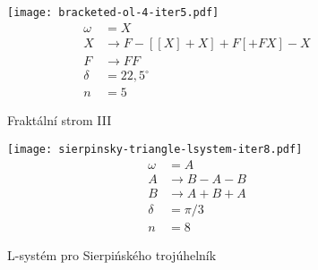 \begin{figure}[p]
    \centering
    \texttt{[image: bracketed-ol-4-iter5.pdf]}
    \begin{align*}
        \omega&=X\\
        X&\to F-[[X]+X]+F[+FX]-X\\
        F&\to FF\\
        \delta&=22{,}5^\circ\\
        n&=5
    \end{align*}
    \caption{Fraktální strom III}
    \label{fig:lsystem-fraktalni-strom-iii}
\end{figure}
\begin{figure}[H]
    \centering
    \texttt{[image: sierpinsky-triangle-lsystem-iter8.pdf]}
    \begin{align*}
        \omega&=A\\
        A&\to B-A-B\\
        B&\to A+B+A\\
        \delta&=\pi/3\\
        n&=8
    \end{align*}
    \caption{L-systém pro Sierpińského trojúhelník}
    \label{fig:lsystem-sierpinskeho-trojúhelnik}
\end{figure}
